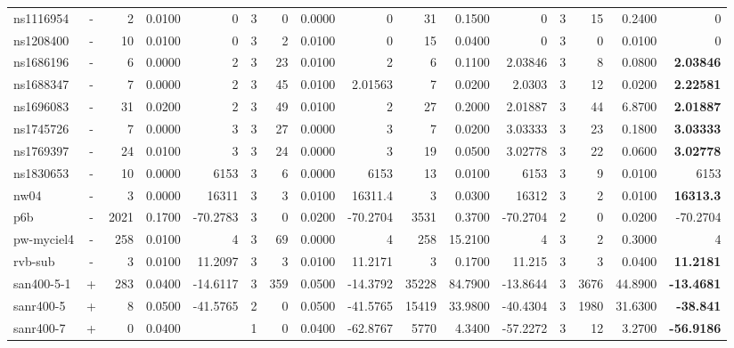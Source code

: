 \documentclass[a4paper]{article}
\begin{document}
\begin{sidewaystable}[h]
\begin{tabular}{l|r|r|r|r|r|r|r|r|r|r|r|r|r|r|r}
ns1116954 & \multicolumn{1}{c|}{ - } & 2 & 0.0100 & 0 & 3 & 0 & 0.0000 & 0 & 31 & 0.1500 & 0 & 3 & 15 & 0.2400 & 0 \\
ns1208400 & \multicolumn{1}{c|}{ - } & 10 & 0.0100 & 0 & 3 & 2 & 0.0100 & 0 & 15 & 0.0400 & 0 & 3 & 0 & 0.0100 & 0 \\
ns1686196 & \multicolumn{1}{c|}{ - } & 6 & 0.0000 & 2 & 3 & 23 & 0.0100 & 2 & 6 & 0.1100 & 2.03846 & 3 & 8 & 0.0800 & \textbf{2.03846} \\
ns1688347 & \multicolumn{1}{c|}{ - } & 7 & 0.0000 & 2 & 3 & 45 & 0.0100 & 2.01563 & 7 & 0.0200 & 2.0303 & 3 & 12 & 0.0200 & \textbf{2.22581} \\
ns1696083 & \multicolumn{1}{c|}{ - } & 31 & 0.0200 & 2 & 3 & 49 & 0.0100 & 2 & 27 & 0.2000 & 2.01887 & 3 & 44 & 6.8700 & \textbf{2.01887} \\
ns1745726 & \multicolumn{1}{c|}{ - } & 7 & 0.0000 & 3 & 3 & 27 & 0.0000 & 3 & 7 & 0.0200 & 3.03333 & 3 & 23 & 0.1800 & \textbf{3.03333} \\
ns1769397 & \multicolumn{1}{c|}{ - } & 24 & 0.0100 & 3 & 3 & 24 & 0.0000 & 3 & 19 & 0.0500 & 3.02778 & 3 & 22 & 0.0600 & \textbf{3.02778} \\
ns1830653 & \multicolumn{1}{c|}{ - } & 10 & 0.0000 & 6153 & 3 & 6 & 0.0000 & 6153 & 13 & 0.0100 & 6153 & 3 & 9 & 0.0100 & 6153 \\
nw04 & \multicolumn{1}{c|}{ - } & 3 & 0.0000 & 16311 & 3 & 3 & 0.0100 & 16311.4 & 3 & 0.0300 & 16312 & 3 & 2 & 0.0100 & \textbf{16313.3} \\
p6b & \multicolumn{1}{c|}{ - } & 2021 & 0.1700 & -70.2783 & 3 & 0 & 0.0200 & -70.2704 & 3531 & 0.3700 & -70.2704 & 2 & 0 & 0.0200 & -70.2704 \\
pw-myciel4 & \multicolumn{1}{c|}{ - } & 258 & 0.0100 & 4 & 3 & 69 & 0.0000 & 4 & 258 & 15.2100 & 4 & 3 & 2 & 0.3000 & 4 \\
rvb-sub & \multicolumn{1}{c|}{ - } & 3 & 0.0100 & 11.2097 & 3 & 3 & 0.0100 & 11.2171 & 3 & 0.1700 & 11.215 & 3 & 3 & 0.0400 & \textbf{11.2181} \\
san400-5-1 & \multicolumn{1}{c|}{ + } & 283 & 0.0400 & -14.6117 & 3 & 359 & 0.0500 & -14.3792 & 35228 & 84.7900 & -13.8644 & 3 & 3676 & 44.8900 & \textbf{-13.4681} \\
sanr400-5 & \multicolumn{1}{c|}{ + } & 8 & 0.0500 & -41.5765 & 2 & 0 & 0.0500 & -41.5765 & 15419 & 33.9800 & -40.4304 & 3 & 1980 & 31.6300 & \textbf{-38.841} \\
sanr400-7 & \multicolumn{1}{c|}{ + } & 0 & 0.0400 &  & 1 & 0 & 0.0400 & -62.8767 & 5770 & 4.3400 & -57.2272 & 3 & 12 & 3.2700 & \textbf{-56.9186} \\

\end{tabular}
\end{sidewaystable}
\end{document}
